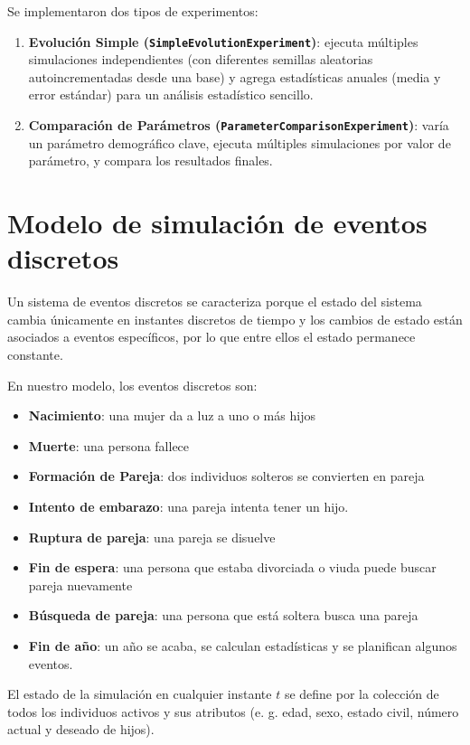 \documentclass[12pt, a4paper, spanish]{report}
\begin{document}
Se implementaron dos tipos de experimentos:

\begin{enumerate}
    \item \textbf{Evolución Simple (\texttt{SimpleEvolutionExperiment})}: ejecuta múltiples simulaciones independientes (con diferentes semillas aleatorias autoincrementadas desde una base) y agrega estadísticas anuales (media y error estándar) para un análisis estadístico sencillo.
    \item \textbf{Comparación de Parámetros (\texttt{ParameterComparisonExperiment})}: varía un parámetro demográfico clave, ejecuta múltiples simulaciones por valor de parámetro, y compara los resultados finales.
\end{enumerate}


\section{Modelo de simulación de eventos discretos}

Un sistema de eventos discretos se caracteriza porque el estado del sistema cambia únicamente en instantes discretos de tiempo y los cambios de estado están asociados a eventos específicos, por lo que entre ellos el estado permanece constante.

En nuestro modelo, los eventos discretos son:

\begin{itemize}
    \item \textbf{Nacimiento}: una mujer da a luz a uno o más hijos
    \item \textbf{Muerte}: una persona fallece
    \item \textbf{Formación de Pareja}: dos individuos solteros se convierten en pareja
    \item \textbf{Intento de embarazo}: una pareja intenta tener un hijo.
    \item \textbf{Ruptura de pareja}: una pareja se disuelve
    \item \textbf{Fin de espera}: una persona que estaba divorciada o viuda puede buscar pareja nuevamente
    \item \textbf{Búsqueda de pareja}: una persona que está soltera busca una pareja
    \item \textbf{Fin de año}: un año se acaba, se calculan estadísticas y se planifican algunos eventos.
\end{itemize}

El estado de la simulación en cualquier instante $t$ se define por la colección de todos los individuos activos y sus atributos (e. g. edad, sexo, estado civil, número actual y deseado de hijos).
\end{document}
